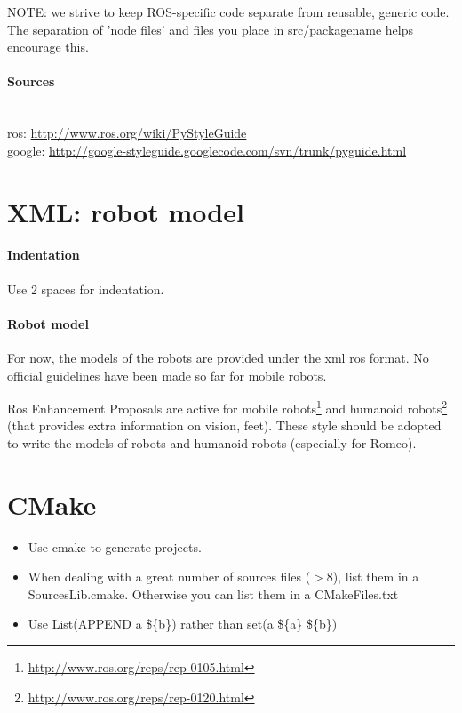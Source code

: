 NOTE: we strive to keep ROS-specific code separate from reusable, generic code. The separation of 'node files' and files you place in src/packagename helps encourage this. 


\paragraph{Sources}~\\
ros: \url{http://www.ros.org/wiki/PyStyleGuide}\\
google: \url{http://google-styleguide.googlecode.com/svn/trunk/pyguide.html}

\section{XML: robot model}
\paragraph{Indentation} Use 2 spaces for indentation.

\paragraph{Robot model}
For now, the models of the robots are provided under the xml ros format. %
No official guidelines have been made so far for mobile robots.

Ros Enhancement Proposals are active for mobile robots\footnote{\url{http://www.ros.org/reps/rep-0105.html}} 
and humanoid robots\footnote{\url{http://www.ros.org/reps/rep-0120.html}}
(that provides extra information on vision, feet).
These style should be adopted to write the models of robots and humanoid robots (especially for Romeo).


\section{CMake}
\begin{itemize}
\item Use cmake to generate projects.

\item When dealing with a great number of sources files ($>8$), list them in a SourcesLib.cmake.
Otherwise you can list them in a CMakeFiles.txt

\item Use List(APPEND a \$\{b\}) rather than set(a \$\{a\} \$\{b\})
\end{itemize}


